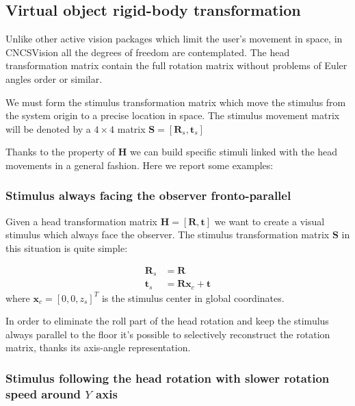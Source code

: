 \documentclass[acmtocl,acmnow]{acmtrans2m}
\begin{document}
% 

\subsection{Virtual object rigid-body transformation}
Unlike other active vision packages which limit the user's movement in space, in CNCSVision all the degrees of freedom are contemplated.
The head transformation matrix contain the full rotation matrix without problems of Euler angles order or similar.

We must form the stimulus transformation matrix which move the stimulus from the system origin to a precise location in space. The stimulus movement matrix will be denoted by a $4\times 4$ matrix 
$\mathbf{S}=[ \mathbf{R}_s, \mathbf{t}_s]$

Thanks to the property of $\mathbf{H}$ we can build specific stimuli linked with the head movements in a general fashion.
Here we report some examples:
\subsubsection{Stimulus always facing the observer fronto-parallel }
Given a head transformation matrix $\mathbf{H}=[\mathbf{R}, \mathbf{t}]$ we want to create a visual stimulus which always face the observer.
The stimulus transformation matrix $\mathbf{S}$ in this situation is quite simple:

\begin{eqnarray*}
 \mathbf{R}_s &= \mathbf{R} \\
 \mathbf{t}_s &= \mathbf{R} \mathbf{x}_c + \mathbf{t}
\end{eqnarray*}
where $\mathbf{x}_c=[0,0,z_s]^T$ is the stimulus center in global coordinates. 

In order to eliminate the roll part of the head rotation and keep the stimulus always parallel to the floor it's possible to selectively reconstruct the rotation matrix, thanks its axis-angle representation.

\subsubsection{Stimulus following the head rotation with slower rotation speed around $Y$ axis }
\end{document}

